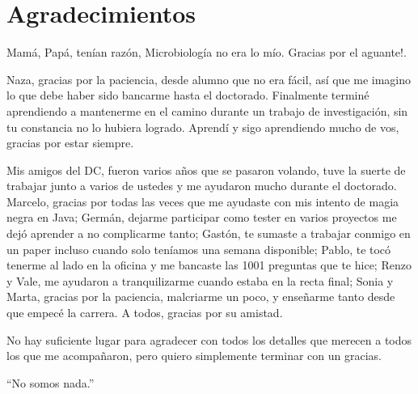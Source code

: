 \chapter*{Agradecimientos}
Mam\'a, Pap\'a, ten\'ian raz\'on, Microbiolog\'ia no era lo m\'io. Gracias por el aguante!.

Naza, gracias por la paciencia, desde alumno que no era f\'acil, as\'i que me imagino lo que debe haber sido bancarme hasta el doctorado. Finalmente termin\'e aprendiendo a mantenerme en el camino durante un trabajo de investigaci\'on, sin tu constancia no lo hubiera logrado. Aprend\'i y sigo aprendiendo mucho de vos, gracias por estar siempre.

Mis amigos del DC, fueron varios a\~nos que se pasaron volando, tuve la suerte de trabajar junto a varios de ustedes y me ayudaron mucho durante el doctorado. Marcelo, gracias por todas las veces que me ayudaste con mis intento de magia negra en Java; Germ\'an, dejarme participar como tester en varios proyectos me dej\'o aprender a no complicarme tanto; Gast\'on, te sumaste a trabajar conmigo en un paper incluso cuando solo ten\'iamos una semana disponible; Pablo, te toc\'o tenerme al lado en la oficina y me bancaste las 1001 preguntas que te hice; Renzo y Vale, me ayudaron a tranquilizarme cuando estaba en la recta final; Sonia y Marta, gracias por la paciencia, malcriarme un poco, y ense\~narme tanto desde que empec\'e la carrera. A todos, gracias por su amistad.

No hay suficiente lugar para agradecer con todos los detalles que merecen a todos los que me acompa\~naron, pero quiero simplemente terminar con un gracias.

\cleardoublepage
\vspace*{7cm}
\hfill {\Large ``No somos nada.''}